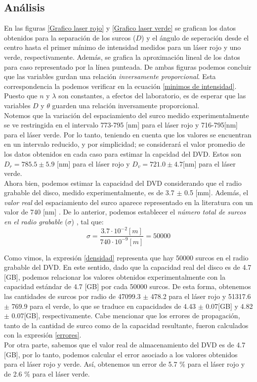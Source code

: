 \documentclass[10pt,a4paper]{article}
\begin{document}
	\begin{multicols}{2}
	\section{Análisis}
	En las figuras \ref{Grafico laser rojo} y \ref{Grafico laser verde} se grafican los datos obtenidos para la separación de los surcos ($D$) y el ángulo de seperación desde el centro hasta el primer mínimo de intensidad  medidos para un láser rojo y uno verde, respectivamente. Además, se grafica la aproximación lineal de los datos para caso representado por la línea punteada. De ambas figuras podemos concluir que las variables gurdan una relación \emph{inversamente proporcional}. Esta correspondencia la podemos verificar en la ecuación \ref{minimos de intensidad}. Puesto que $n$ y $\lambda$ son constantes, a efectos del laboratorio, es de esperar que las variables $D$ y $\theta$ guarden una relación inversamente proporcional.\\
	
	 Notemos que la variación del espaciamiento del surco medido experimentalmente se ve restringida en el intervalo 773-795 [nm] para el láser rojo y 716-795[nm] para el láser verde. Por lo tanto, teniendo en cuenta que los valores se encuentran en un intervalo reducido, y por simplicidad; se considerará el valor promedio de los datos obtenidos en cada caso para estimar la capcidad del DVD. Estos son $D_r =785.5 \pm 5.9$ [nm] para el láser rojo y $D_v = 721.0 \pm  4.7$[nm] para el láser verde.\\
	 
	 Ahora bien, podemos estimar la capacidad del DVD considerando que el radio grabable del disco, medido experimentalmente, es de 3.7 $\pm$ 0.5 [mm]. Además, el \emph{valor real} del espaciamiento del surco aparece representado en la literatura con un valor de 740 [nm] \cite{wikiCD}. De lo anterior, podemos establecer el \emph{número total de surcos en el radio grabable} ($\sigma$) , tal que:
	 \begin{equation}\label{densidad}
	 \sigma = \frac{3.7\cdot 10^{-2} [m]}{740 \cdot 10^{-9} [m]} = 50000 
	 \end{equation}
	 
	 Como vimos, la expresión \ref{densidad} representa que hay 50000 surcos en el radio grabable del DVD. En este sentido, dado que la capacidad real del disco es de 4.7 [GB], podemos relacionar los valores obtenidos experimentalmente con la capacidad estándar de 4.7 [GB] por cada 50000 surcos. De esta forma, obtenemos las cantidades de surcos por radio de 47099.3 $\pm$ 478.2 para el láser rojo y 51317.6 $\pm$ 769.9 para el verde, lo que se traduce en capacidades de 4.43 $\pm$ 0.07[GB] y 4.82 $\pm$ 0.07[GB], respectivamente. Cabe mencionar que los errores de propagación, tanto de la cantidad de surco como de la capacidad resultante, fueron calculados con la expresión \ref{errores}. \\
	Por otra parte, sabemos que el valor real de almacenamiento del DVD es de 4.7 [GB], por lo tanto, podemos calcular el error asociado a los valores obtenidos para el láser rojo y verde. Así, obtenemos un error de 5.7 $\%$ para el láser rojo y de 2.6 $\%$ para el láser verde.
	

\end{multicols}
\end{document}
